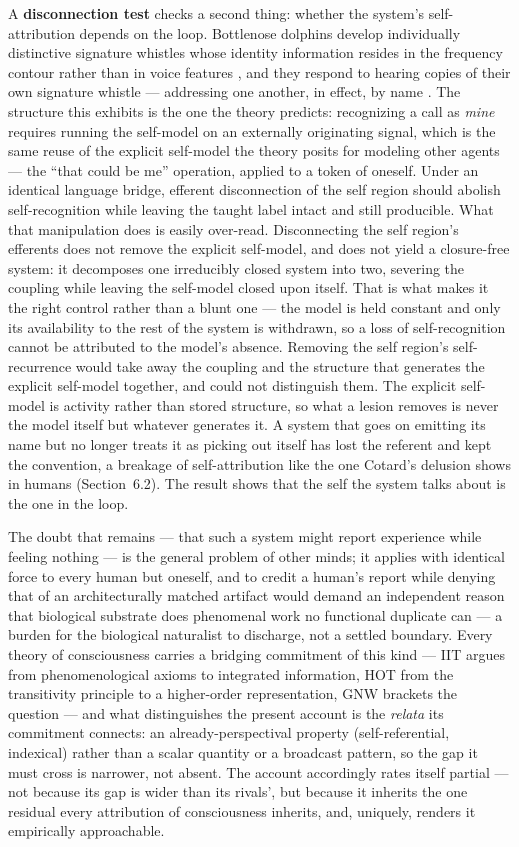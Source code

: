 \documentclass[12pt]{article}
\newcommand{\revend}{}
\begin{document}
{A \textbf{disconnection test} checks a second thing: whether the system's self-attribution depends on the loop. Bottlenose dolphins develop individually distinctive signature whistles whose identity information resides in the frequency contour rather than in voice features \citep{JanikSayighWells2006}, and they respond to hearing copies of their own signature whistle --- addressing one another, in effect, by name \citep{KingJanik2013}. The structure this exhibits is the one the theory predicts: recognizing a call as \emph{mine} requires running the self-model on an externally originating signal, which is the same reuse of the explicit self-model the theory posits for modeling other agents --- the ``that could be me'' operation, applied to a token of oneself. Under an identical language bridge, efferent disconnection of the self region should abolish self-recognition while leaving the taught label intact and still producible. What that manipulation does is easily over-read. Disconnecting the self region's efferents does not remove the explicit self-model, and does not yield a closure-free system: it decomposes one irreducibly closed system into two, severing the coupling while leaving the self-model closed upon itself. That is what makes it the right control rather than a blunt one --- the model is held constant and only its availability to the rest of the system is withdrawn, so a loss of self-recognition cannot be attributed to the model's absence. Removing the self region's self-recurrence would take away the coupling and the structure that generates the explicit self-model together, and could not distinguish them. The explicit self-model is activity rather than stored structure, so what a lesion removes is never the model itself but whatever generates it. A system that goes on emitting its name but no longer treats it as picking out itself has lost the referent and kept the convention, a breakage of self-attribution like the one Cotard's delusion shows in humans (Section~6.2). The result shows that the self the system talks about is the one in the loop.

The doubt that remains --- that such a system might report experience while feeling nothing --- is the general problem of other minds; it applies with identical force to every human but oneself, and to credit a human's report while denying that of an architecturally matched artifact would demand an independent reason that biological substrate does phenomenal work no functional duplicate can --- a burden for the biological naturalist to discharge, not a settled boundary. Every theory of consciousness carries a bridging commitment of this kind --- IIT argues from phenomenological axioms to integrated information, HOT from the transitivity principle to a higher-order representation, GNW brackets the question --- and what distinguishes the present account is the \emph{relata} its commitment connects: an already-perspectival property (self-referential, indexical) rather than a scalar quantity or a broadcast pattern, so the gap it must cross is narrower, not absent. The account accordingly rates itself partial --- not because its gap is wider than its rivals', but because it inherits the one residual every attribution of consciousness inherits, and, uniquely, renders it empirically approachable.\revend}
\end{document}
